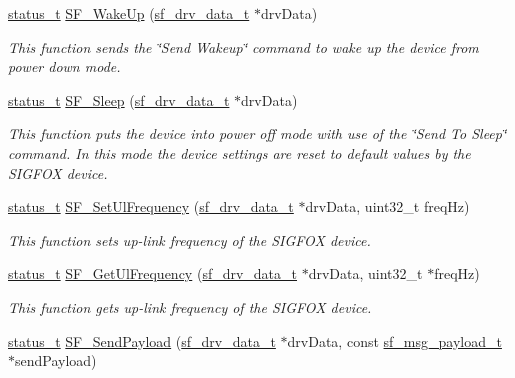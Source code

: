 \begin{DoxyCompactItemize}
\mbox{\hyperlink{group__ksdk__common_gaaabdaf7ee58ca7269bd4bf24efcde092}{status\+\_\+t}} \mbox{\hyperlink{group__sf__functions__group_gafcfab93eda54d3831f57470780dae9dd}{S\+F\+\_\+\+Wake\+Up}} (\mbox{\hyperlink{structsf__drv__data__t}{sf\+\_\+drv\+\_\+data\+\_\+t}} $\ast$drv\+Data)
\begin{DoxyCompactList}\small\item\em This function sends the \char`\"{}\+Send Wakeup\char`\"{} command to wake up the device from power down mode. \end{DoxyCompactList}\item 
\mbox{\hyperlink{group__ksdk__common_gaaabdaf7ee58ca7269bd4bf24efcde092}{status\+\_\+t}} \mbox{\hyperlink{group__sf__functions__group_ga1976f6e21d4d394239d20b241dbb2453}{S\+F\+\_\+\+Sleep}} (\mbox{\hyperlink{structsf__drv__data__t}{sf\+\_\+drv\+\_\+data\+\_\+t}} $\ast$drv\+Data)
\begin{DoxyCompactList}\small\item\em This function puts the device into power off mode with use of the \char`\"{}\+Send To Sleep\char`\"{} command. In this mode the device settings are reset to default values by the S\+I\+G\+F\+OX device. \end{DoxyCompactList}\item 
\mbox{\hyperlink{group__ksdk__common_gaaabdaf7ee58ca7269bd4bf24efcde092}{status\+\_\+t}} \mbox{\hyperlink{group__sf__functions__group_gac5651ed6f3c5cb0efc45ed5c15d7697c}{S\+F\+\_\+\+Set\+Ul\+Frequency}} (\mbox{\hyperlink{structsf__drv__data__t}{sf\+\_\+drv\+\_\+data\+\_\+t}} $\ast$drv\+Data, uint32\+\_\+t freq\+Hz)
\begin{DoxyCompactList}\small\item\em This function sets up-\/link frequency of the S\+I\+G\+F\+OX device. \end{DoxyCompactList}\item 
\mbox{\hyperlink{group__ksdk__common_gaaabdaf7ee58ca7269bd4bf24efcde092}{status\+\_\+t}} \mbox{\hyperlink{group__sf__functions__group_ga6652c5c69ff2e8687e5575ea84229c21}{S\+F\+\_\+\+Get\+Ul\+Frequency}} (\mbox{\hyperlink{structsf__drv__data__t}{sf\+\_\+drv\+\_\+data\+\_\+t}} $\ast$drv\+Data, uint32\+\_\+t $\ast$freq\+Hz)
\begin{DoxyCompactList}\small\item\em This function gets up-\/link frequency of the S\+I\+G\+F\+OX device. \end{DoxyCompactList}\item 
\mbox{\hyperlink{group__ksdk__common_gaaabdaf7ee58ca7269bd4bf24efcde092}{status\+\_\+t}} \mbox{\hyperlink{group__sf__functions__group_ga44c782b6ce3a518584e00acb8a8957fd}{S\+F\+\_\+\+Send\+Payload}} (\mbox{\hyperlink{structsf__drv__data__t}{sf\+\_\+drv\+\_\+data\+\_\+t}} $\ast$drv\+Data, const \mbox{\hyperlink{structsf__msg__payload__t}{sf\+\_\+msg\+\_\+payload\+\_\+t}} $\ast$send\+Payload)

\end{DoxyCompactItemize}
